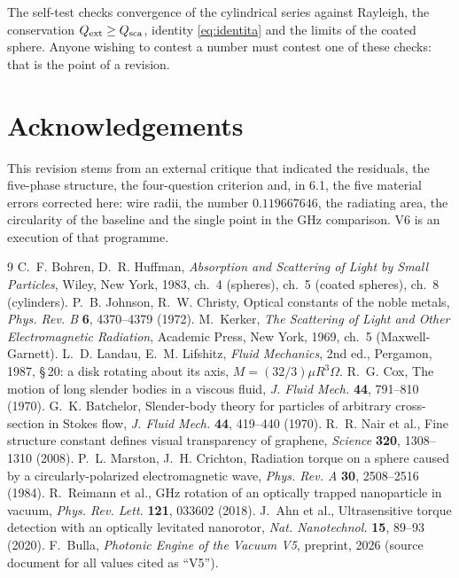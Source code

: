\documentclass[11pt,a4paper]{article}
\begin{document}
The self-test checks convergence of the cylindrical series against Rayleigh, the
conservation $Q_{\rm ext}\ge Q_{\rm sca}$, identity \eqref{eq:identita} and the limits
of the coated sphere. Anyone wishing to contest a number must contest one of these
checks: that is the point of a revision.

\section*{Acknowledgements}
This revision stems from an external critique that indicated the residuals, the
five-phase structure, the four-question criterion and, in 6.1, the five material errors
corrected here: wire radii, the number $0.119667646$, the radiating area, the
circularity of the baseline and the single point in the GHz comparison. V6 is an
execution of that programme.

\begin{thebibliography}{9}\small
{} C.~F. Bohren, D.~R. Huffman, \emph{Absorption and Scattering of Light
by Small Particles}, Wiley, New York, 1983, ch.~4 (spheres), ch.~5 (coated spheres),
ch.~8 (cylinders).
 P.~B. Johnson, R.~W. Christy, Optical constants of the noble metals,
\emph{Phys. Rev. B} \textbf{6}, 4370--4379 (1972).
 M.~Kerker, \emph{The Scattering of Light and Other Electromagnetic
Radiation}, Academic Press, New York, 1969, ch.~5 (Maxwell-Garnett).
 L.~D. Landau, E.~M. Lifshitz, \emph{Fluid Mechanics}, 2nd ed., Pergamon,
1987, \S\,20: a disk rotating about its axis, $M=(32/3)\mu R^3\Omega$.
 R.~G. Cox, The motion of long slender bodies in a viscous fluid,
\emph{J. Fluid Mech.} \textbf{44}, 791--810 (1970).
 G.~K. Batchelor, Slender-body theory for particles of arbitrary
cross-section in Stokes flow, \emph{J. Fluid Mech.} \textbf{44}, 419--440 (1970).
 R.~R. Nair et al., Fine structure constant defines visual transparency
of graphene, \emph{Science} \textbf{320}, 1308--1310 (2008).
 P.~L. Marston, J.~H. Crichton, Radiation torque on a sphere caused by
a circularly-polarized electromagnetic wave, \emph{Phys. Rev. A} \textbf{30},
2508--2516 (1984).
 R.~Reimann et al., GHz rotation of an optically trapped nanoparticle
in vacuum, \emph{Phys. Rev. Lett.} \textbf{121}, 033602 (2018).
 J.~Ahn et al., Ultrasensitive torque detection with an optically
levitated nanorotor, \emph{Nat. Nanotechnol.} \textbf{15}, 89--93 (2020).
 F.~Bulla, \emph{Photonic Engine of the Vacuum V5}, preprint, 2026 (source
document for all values cited as ``V5'').
\end{thebibliography}
\end{document}
